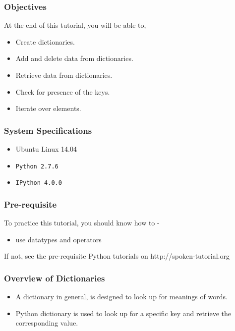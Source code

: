 \documentclass[17pt]{beamer}
\begin{document}
\begin{frame}
\frametitle{Objectives}
\label{sec-2}

  At the end of this tutorial, you will be able to, \pause
\begin{itemize}
\item Create dictionaries.\pause
\item Add and delete data from dictionaries.\pause
\item Retrieve data from dictionaries.\pause
\item Check for presence of the keys.\pause
\item Iterate over elements.
\end{itemize}
\end{frame}
\begin{frame}
\frametitle{System Specifications}\pause
\begin{itemize}
\item Ubuntu Linux 14.04\pause
\item \texttt{Python 2.7.6} \pause
\item \texttt{IPython 4.0.0}
\end{itemize}
\end{frame}
\begin{frame}
\frametitle{Pre-requisite}
\label{sec-3}

  To practice this tutorial, you should know how to -\pause

\begin{itemize}
\item use datatypes and operators\pause
\end{itemize}
If not, see the pre-requisite Python tutorials on {\color{blue}http://spoken-tutorial.org}
\end{frame}
\begin{frame}
\frametitle{Overview of Dictionaries}
\label{sec-4}

\begin{itemize}
\item A dictionary in general, is designed to look up for meanings of words. \pause
\item Python dictionary is used to look up for a specific key and retrieve the corresponding value. 

\end{itemize}
\end{frame}
\end{document}
